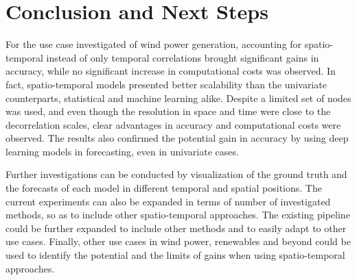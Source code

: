 \chapter{Conclusion and Next Steps}

For the use case investigated of wind power generation, accounting for spatio-temporal instead of only temporal correlations brought significant gains in accuracy, while no significant increase in computational costs was observed.
In fact, spatio-temporal models presented better scalability than the univariate counterparts, statistical and machine learning alike.
Despite a limited set of nodes was used, and even though the resolution in space and time were close to the decorrelation scales, clear advantages in accuracy and computational costs were observed.
The results also confirmed the potential gain in accuracy by using deep learning models in forecasting, even in univariate cases.

Further investigations can be conducted by visualization of the ground truth and the forecasts of each model in different temporal and spatial positions.
The current experiments can also be expanded in terms of number of investigated methods, so as to include other spatio-temporal approaches.
The existing pipeline could be further expanded to include other methods and to easily adapt to other use cases.
Finally, other use cases in wind power, renewables and beyond could be used to identify the potential and the limits of gains when using spatio-temporal approaches.